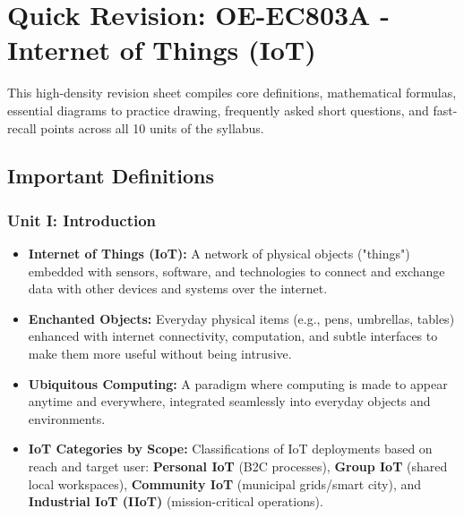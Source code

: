 \chapter{Quick Revision: OE-EC803A - Internet of Things (IoT)}

This high-density revision sheet compiles core definitions, mathematical formulas, essential diagrams to practice drawing, frequently asked short questions, and fast-recall points across all 10 units of the syllabus.


\section{Important Definitions}

\subsection{Unit I: Introduction}
\begin{itemize}
  \item   \textbf{Internet of Things (IoT):} A network of physical objects ("things") embedded with sensors, software, and technologies to connect and exchange data with other devices and systems over the internet.
  \item   \textbf{Enchanted Objects:} Everyday physical items (e.g., pens, umbrellas, tables) enhanced with internet connectivity, computation, and subtle interfaces to make them more useful without being intrusive.
  \item   \textbf{Ubiquitous Computing:} A paradigm where computing is made to appear anytime and everywhere, integrated seamlessly into everyday objects and environments.
  \item   \textbf{IoT Categories by Scope:} Classifications of IoT deployments based on reach and target user: \textbf{Personal IoT} (B2C processes), \textbf{Group IoT} (shared local workspaces), \textbf{Community IoT} (municipal grids/smart city), and \textbf{Industrial IoT (IIoT)} (mission-critical operations).
\end{itemize}


